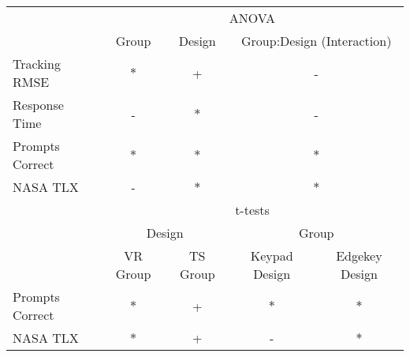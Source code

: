 \begin{tabular}{@{}lcccc@{}}
\toprule
                & \multicolumn{4}{c}{ANOVA} \\
                & Group & Design & \multicolumn{2}{c}{Group:Design (Interaction)}\\
\midrule
Tracking RMSE   & $*$ &  +  & \multicolumn{2}{c}{ - } \\
Response Time   &  -  & $*$ & \multicolumn{2}{c}{ - } \\
Prompts Correct & $*$ & $*$ & \multicolumn{2}{c}{$*$} \\
NASA TLX        &  -  & $*$ & \multicolumn{2}{c}{$*$} \\
\midrule
                & \multicolumn{4}{c}{t-tests} \\
                & \multicolumn{2}{c}{Design} & \multicolumn{2}{c}{Group} \\
                & VR Group & TS Group  & Keypad Design & Edgekey Design \\
\midrule
Prompts Correct & $*$ & + & $*$ & $*$ \\
NASA TLX        & $*$ & + &  -  & $*$ \\
\bottomrule
\end{tabular}

